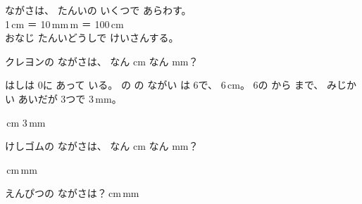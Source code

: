 \begin{taisetsu}
ながさは、 たんいの いくつで あらわす。\\
1\,cm ＝ 10\,mm\,m ＝ 100\,cm\\
おなじ たんいどうしで けいさんする。
\end{taisetsu}

{}

\clearpage

\begin{reidai}[ものさしで よむ]
クレヨンの ながさは、 なん cm なん mm？
\begin{bkfigure}
\end{bkfigure}
\kangaekata はしは 0に あって いる。 の の ながい は 6で、 6\,cm。 6の から まで、 みじかい あいだが 3つで 3\,mm。

\,cm 3\,mm
\end{reidai}

\begin{jibun}
けしゴムの ながさは、 なん cm なん mm？
\par\vspace{4pt}
\noindent\begin{minipage}[b]{80mm}
\end{minipage}\hfill
\begin{minipage}[b]{44mm}
{\sffamily\bfseries\small\color{bkOrange}\bkkotaelabel}\par\vspace{2pt}
\noindent\bkkakikomi\,cm\enspace\bkkakikomi\,mm
\end{minipage}
\par\vspace{3pt}
\noindent{}\par\vspace{2pt}
\noindent\hfill えんぴつの ながさは？\enspace\bkkakikomi\,cm\enspace\bkkakikomi\,mm
\end{jibun}

